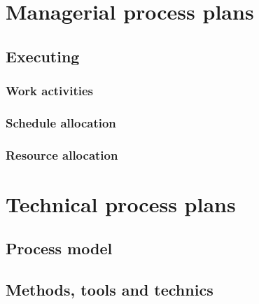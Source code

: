\documentclass[twocolumn]{article}
\begin{document}
\section{Managerial process plans}
\subsection{Executing}
\subsubsection{Work activities}
\subsubsection{Schedule allocation}
\subsubsection{Resource allocation}

\section{Technical process plans}
\subsection{Process model}
\subsection{Methods, tools and technics}
\end{document}
